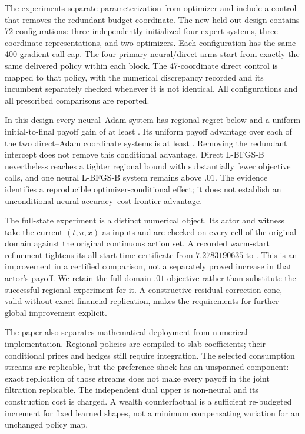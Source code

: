 The experiments separate parameterization from optimizer and include a control that removes the redundant budget coordinate. The new held-out design contains 72 configurations: three independently initialized four-expert systems, three coordinate representations, and two optimizers. Each configuration has the same 400-gradient-call cap. The four primary neural/direct arms start from exactly the same delivered policy within each block. The 47-coordinate direct control is mapped to that policy, with the numerical discrepancy recorded and its incumbent separately checked whenever it is not identical. All configurations and all prescribed comparisons are reported.

In this design every neural--Adam system has regional regret below \RXXIIINeuralRegret{} and a uniform initial-to-final payoff gain of at least \RXXIIIGainMin{}. Its uniform payoff advantage over each of the two direct--Adam coordinate systems is at least \RXXIIIConditionalGain{}. Removing the redundant intercept does not remove this conditional advantage. Direct L-BFGS-B nevertheless reaches a tighter regional bound with substantially fewer objective calls, and one neural L-BFGS-B system remains above $.01$. The evidence identifies a reproducible optimizer-conditional effect; it does not establish an unconditional neural accuracy--cost frontier advantage.

The full-state experiment is a distinct numerical object. Its actor and witness take the current $(t,u,x)$ as inputs and are checked on every cell of the original domain against the original continuous action set. A recorded warm-start refinement tightens its all-start-time certificate from $7.2783190635$ to \RXXIIGlobalBound{}. This is an improvement in a certified comparison, not a separately proved increase in that actor's payoff. We retain the full-domain $.01$ objective rather than substitute the successful regional experiment for it. A constructive residual-correction cone, valid without exact financial replication, makes the requirements for further global improvement explicit.

The paper also separates mathematical deployment from numerical implementation. Regional policies are compiled to slab coefficients; their conditional prices and hedges still require integration. The selected consumption streams are replicable, but the preference shock has an unspanned component: exact replication of those streams does not make every payoff in the joint filtration replicable. The independent dual upper is non-neural and its construction cost is charged. A wealth counterfactual is a sufficient re-budgeted increment for fixed learned shapes, not a minimum compensating variation for an unchanged policy map.

